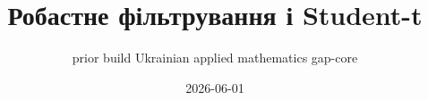\documentclass[11pt,a4paper,oneside]{book}
\begin{document}
\pagestyle{plain}
\title{Робастне фільтрування і Student-t}
\author{prior build Ukrainian applied mathematics gap-core}
\date{2026-06-01}
\maketitle
\tableofcontents

\end{document}
